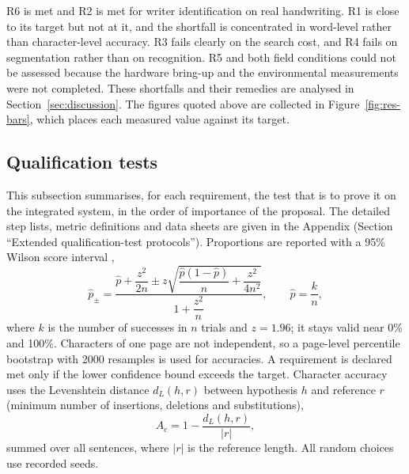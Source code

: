 R6 is met and R2 is met for writer identification on real handwriting.
R1 is close to its target but not at it, and the shortfall is concentrated in word-level rather than character-level accuracy.
R3 fails clearly on the search cost, and R4 fails on segmentation rather than on recognition.
R5 and both field conditions could not be assessed because the hardware bring-up and the environmental measurements were not completed.
These shortfalls and their remedies are analysed in Section~\ref{sec:discussion}.
The figures quoted above are collected in Figure~\ref{fig:res-bars}, which places each measured value against its target.


\subsection{Qualification tests} %
\label{sec:res-qtp}

This subsection summarises, for each requirement, the test that is to prove it on the integrated system, in the order of importance of the proposal.
The detailed step lists, metric definitions and data sheets are given in the Appendix (Section ``Extended qualification-test protocols'').
Proportions are reported with a 95\% Wilson score interval \cite{wilson1927},
\begin{equation}
\label{eq:res-wilson}
\hat p_{\pm}=\frac{\hat p+\dfrac{z^2}{2n}\pm z\sqrt{\dfrac{\hat p(1-\hat p)}{n}+\dfrac{z^2}{4n^2}}}{1+\dfrac{z^2}{n}},\qquad \hat p=\frac{k}{n},
\end{equation}
where $k$ is the number of successes in $n$ trials and $z=1.96$; it stays valid near 0\% and 100\%.
Characters of one page are not independent, so a page-level percentile bootstrap with 2000 resamples \cite{efron1979} is used for accuracies.
A requirement is declared met only if the lower confidence bound exceeds the target.
Character accuracy uses the Levenshtein distance \cite{levenshtein1966} $d_L(h,r)$ between hypothesis $h$ and reference $r$ (minimum number of insertions, deletions and substitutions),
\begin{equation}
\label{eq:res-cacc}
A_{\mathrm{c}}=1-\frac{d_L(h,r)}{\lvert r\rvert},
\end{equation}
summed over all sentences, where $\lvert r\rvert$ is the reference length.
All random choices use recorded seeds.


\medskip
\label{sec:res-qtp1}

